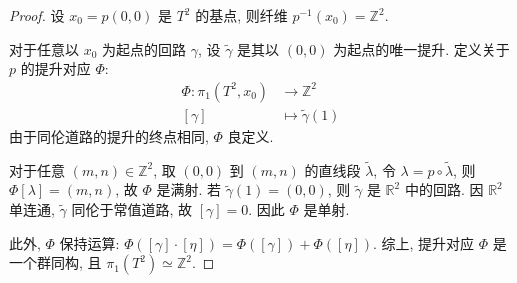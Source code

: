 \documentclass[../main.tex]{subfiles}
\begin{document}
\begin{proof}
    设 \( x_0= p( 0,0 ) \) 是 \( T^{2} \) 的基点, 则纤维 \( p^{-1} ( x_0 )= \mathbb{Z} ^{2} \).
    
    对于任意以 \( x_0 \) 为起点的回路 \( \gamma \), 设 \( \tilde{\gamma} \) 是其以 \( ( 0,0 ) \) 为起点的唯一提升. 定义关于 \( p \) 的提升对应 \( \Phi \):
    \[
    \begin{aligned}
    \Phi : \pi _1 ( T^{2},x_0 )&\to \mathbb{Z} ^{2}\\ 
     [ \gamma ]&\mapsto  \tilde{\gamma} ( 1 )   
    \end{aligned}
    \]
    由于同伦道路的提升的终点相同, \( \Phi \) 良定义. 
    
    对于任意 \( ( m,n )\in \mathbb{Z} ^{2} \), 取 \( ( 0,0 ) \) 到 \( ( m,n ) \) 的直线段 \( \tilde{\lambda} \), 令 \( \lambda = p\circ  \tilde{\lambda} \), 则 \( \Phi [ \lambda ]= ( m,n ) \), 故 \( \Phi \) 是满射. 
    若 \( \tilde{\gamma} ( 1 )= ( 0,0 ) \), 则 \( \tilde{\gamma} \) 是 \( \mathbb{R}^2 \) 中的回路. 因 \( \mathbb{R}^2 \) 单连通, \( \tilde{\gamma} \) 同伦于常值道路, 故 \( [ \gamma ]= 0 \). 因此 \( \Phi \) 是单射.
    
    此外, \( \Phi \) 保持运算: \( \Phi([ \gamma ]\cdot [\eta ])= \Phi ( [ \gamma ] )+ \Phi ( [\eta] ) \). 
    综上, 提升对应 \( \Phi \) 是一个群同构, 且 \( \pi _1 ( T^{2} )\simeq \mathbb{Z} ^{2} \).       
\end{proof}
\end{document}

